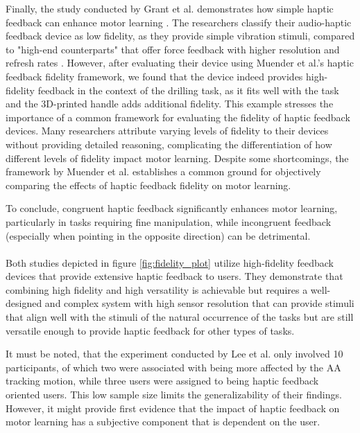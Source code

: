 Finally, the study conducted by Grant et al. demonstrates how simple haptic feedback can enhance motor learning \cite{Grant2019}. The researchers classify their audio-haptic feedback device as low fidelity, as they provide simple vibration stimuli, compared to "high-end counterparts" that offer force feedback with higher resolution and refresh rates \cite{Grant2019}. However, after evaluating their device using Muender et al.'s haptic feedback fidelity framework, we found that the device indeed provides high-fidelity feedback in the context of the drilling task, as it fits well with the task and the 3D-printed handle adds additional fidelity. 
This example stresses the importance of a common framework for evaluating the fidelity of haptic feedback devices. Many researchers attribute varying levels of fidelity to their devices without providing detailed reasoning, complicating the differentiation of how different levels of fidelity impact motor learning. Despite some shortcomings, the framework by Muender et al. establishes a common ground for objectively comparing the effects of haptic feedback fidelity on motor learning.


To conclude, congruent haptic feedback significantly enhances motor learning, particularly in tasks requiring fine manipulation, while incongruent feedback (especially when pointing in the opposite direction) can be detrimental. 
\paragraph{}

\paragraph{}
Both studies depicted in figure \ref{fig:fidelity_plot} utilize high-fidelity feedback devices that provide extensive haptic feedback to users. They demonstrate that combining high fidelity and high versatility is achievable but requires a well-designed and complex system with high sensor resolution that can provide stimuli that align well with the stimuli of the natural occurrence of the tasks but are still versatile enough to provide haptic feedback for other types of tasks.

It must be noted, that the experiment conducted by Lee et al. only involved 10 participants, of which two were associated with being more affected by the AA tracking motion, while three users were assigned to being haptic feedback oriented users. This low sample size limits the generalizability of their findings. However, it might provide first evidence that the impact of haptic feedback on motor learning has a subjective component that is dependent on the user.


